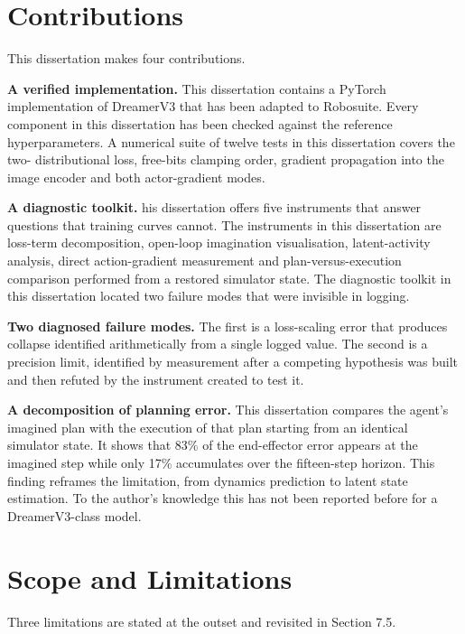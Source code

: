 \documentclass[12pt,a4paper,oneside]{report}
\begin{document}
\hypertarget{contributions}{%
\section{Contributions}\label{contributions}}

This dissertation makes four contributions.

\textbf{A verified implementation.} This dissertation contains a PyTorch implementation of DreamerV3 that has been adapted to Robosuite. Every component in this dissertation has been checked against the reference hyperparameters. A numerical suite of twelve tests in this dissertation covers the two- distributional loss, free-bits clamping order, gradient propagation into the image encoder and both actor-gradient modes.

\textbf{A diagnostic toolkit.} his dissertation offers five instruments that answer questions that training curves cannot. The instruments in this dissertation are loss-term decomposition, open-loop imagination visualisation, latent-activity analysis, direct action-gradient measurement and plan-versus-execution comparison performed from a restored simulator state. The diagnostic toolkit in this dissertation located two failure modes that were invisible in logging.

\textbf{Two diagnosed failure modes.} The first is a loss-scaling error that produces collapse identified arithmetically from a single logged value. The second is a precision limit, identified by measurement after a competing hypothesis was built and then refuted by the instrument created to test it.

\textbf{A decomposition of planning error.} This dissertation compares the agent’s imagined plan with the execution of that plan starting from an identical simulator state. It shows that 83\% of the end-effector error appears at the imagined step while only 17\% accumulates over the fifteen-step horizon. This finding reframes the limitation, from dynamics prediction to latent state estimation. To the author’s knowledge this has not been reported before for a DreamerV3-class model.



\hypertarget{scope-and-limitations}{%
\section{Scope and Limitations}\label{scope-and-limitations}}

Three limitations are stated at the outset and revisited in Section 7.5.
\end{document}

